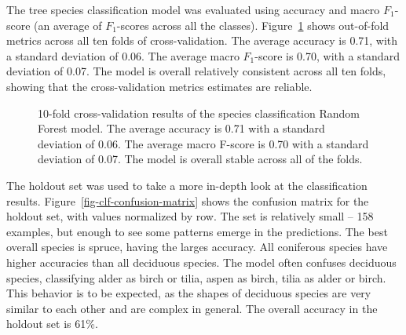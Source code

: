 The tree species classification model was evaluated using accuracy and macro $F_1$-score (an average of $F_1$-scores across all the classes).
Figure~\ref{fig-cv-clf} shows out-of-fold metrics across all ten folds of cross-validation.
The average accuracy is 0.71, with a standard deviation of 0.06.
The average macro $F_1$-score is 0.70, with a standard deviation of 0.07.
The model is overall relatively consistent across all ten folds, showing that the cross-validation metrics estimates are reliable.

\begin{figure}
\caption[Cross-validation results of the species classification Random Forest model]{\label{fig-cv-clf}10-fold cross-validation results of the
species classification Random Forest model. The average accuracy is 0.71
with a standard deviation of 0.06. The average macro F-score is 0.70
with a standard deviation of 0.07. The model is overall stable across
all of the folds.}
\end{figure}

The holdout set was used to take a more in-depth look at the classification results.
Figure~\ref{fig-clf-confusion-matrix} shows the confusion matrix for the holdout set, with values normalized by row.
The set is relatively small – 158 examples, but enough to see some patterns emerge in the predictions.
The best overall species is spruce, having the larges accuracy.
All coniferous species have higher accuracies than all deciduous species.
The model often confuses deciduous species, classifying alder as birch or tilia, aspen as birch, tilia as alder or birch.
This behavior is to be expected, as the shapes of deciduous species are very similar to each other and are complex in general.
The overall accuracy in the holdout set is 61\%.

